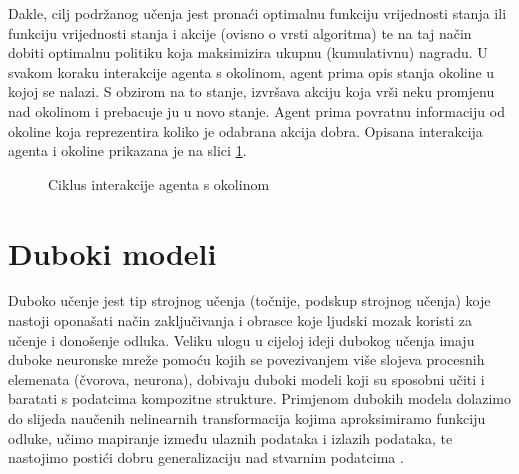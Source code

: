 Dakle, cilj podržanog učenja jest pronaći optimalnu funkciju vrijednosti stanja ili funkciju vrijednosti stanja i akcije (ovisno o vrsti algoritma) te na taj način dobiti optimalnu politiku koja maksimizira ukupnu (kumulativnu) nagradu. U svakom koraku interakcije agenta s okolinom, agent prima opis stanja okoline u kojoj se nalazi. S obzirom na to stanje, izvršava akciju koja vrši neku promjenu nad okolinom i prebacuje ju u novo stanje. Agent prima povratnu informaciju od okoline koja reprezentira koliko je odabrana akcija dobra. Opisana interakcija agenta i okoline prikazana je na slici \ref{fig:rl}.

\begin{figure}[H]
    \centering
    \caption{Ciklus interakcije agenta s okolinom \cite{wikiRL}}
    \label{fig:rl}
\end{figure}

\section{Duboki modeli}
\label{chap:duboki-modeli}

Duboko učenje  jest tip strojnog učenja (točnije, podskup strojnog učenja) koje nastoji oponašati način zaključivanja i obrasce koje ljudski mozak koristi za učenje i donošenje odluka. Veliku ulogu u cijeloj ideji dubokog učenja imaju duboke neuronske mreže  pomoću kojih se povezivanjem više slojeva procesnih elemenata (čvorova, neurona), dobivaju duboki modeli koji su sposobni učiti i baratati s podatcima kompozitne strukture. Primjenom dubokih modela dolazimo do slijeda naučenih nelinearnih transformacija kojima aproksimiramo funkciju odluke, učimo mapiranje između ulaznih podataka i izlazih podataka, te nastojimo postići dobru generalizaciju nad stvarnim podatcima \cite{DLBook}. 

